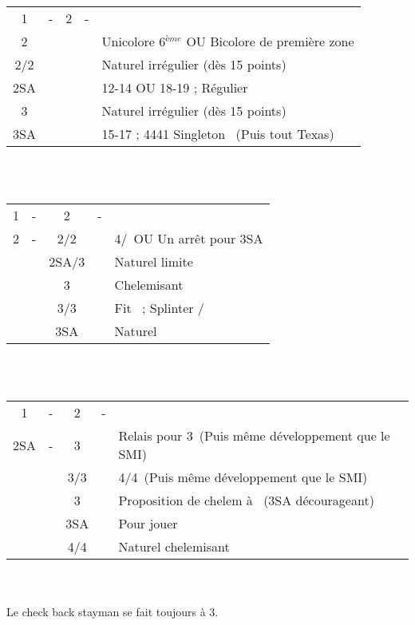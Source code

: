\documentclass[a4paper, oneside, 11pt]{report}
\begin{document}
\newpage
		\begin{tabular}{cccc|l}
		1\carreau & - & 2\trefle & - &\\
		2\carreau &&&& Unicolore 6$^{ème}$ OU Bicolore de première zone\\
		2\coeur/2\pique &&&& Naturel irrégulier (dès 15 points) \\
		2SA &&&& 12-14 OU 18-19 ; Régulier\\
		3\trefle &&&& Naturel irrégulier (dès 15 points)\\
		3SA &&&& 15-17 ; 4441 Singleton \trefle\ (Puis tout Texas)\\
		\end{tabular}\\\\

		\begin{tabular}{cccc|l}
		1\carreau & - & 2\trefle & - &\\
		2\carreau & - & 2\coeur/2\pique && 4\coeur/\pique\ OU Un arrêt pour 3SA\\
		&& 2SA/3\trefle && Naturel limite\\
		&& 3\carreau && Chelemisant \carreau\\
		&& 3\coeur/3\pique && Fit \carreau\ ; Splinter \coeur/\pique\\
		&& 3SA && Naturel\\
		\end{tabular}\\\\

		\begin{tabular}{cccc|l}
		1\carreau & - & 2\trefle & - &\\
		2SA & - & 3\trefle && Relais pour 3\carreau\ (Puis même développement que le SMI)\\
		&& 3\carreau/3\coeur && 4\coeur/4\pique\ (Puis même développement que le SMI)\\
		&& 3\pique && Proposition de chelem à \trefle\ (3SA décourageant)\\
		&& 3SA && Pour jouer\\
		&& 4\trefle/4\carreau && Naturel chelemisant\\
		\end{tabular}\\\\

		Le check back stayman se fait toujours à 3\trefle.\\
\end{document}

